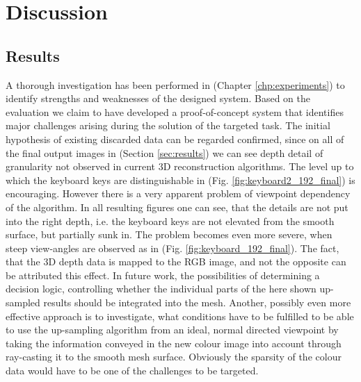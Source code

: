 \documentclass{ucl_thesis}
\newcommand{\figref}[1]{(Fig. \ref{#1})}
\newcommand{\secref}[1]{(Section \ref{#1})}
\newcommand{\chpref}[1]{(Chapter \ref{#1})}
\begin{document}
\chapter{Discussion} 
\label{chp:discussion}

\section{Results}
\label{sec:discussion_results}

\par A thorough investigation has been performed in \chpref{chp:experiments} to identify strengths and weaknesses of the designed system. Based on the evaluation we claim to have developed a proof-of-concept system that identifies major challenges arising during the solution of the targeted task. The initial hypothesis of existing discarded data can be regarded confirmed, since on all of the final output images in \secref{sec:results} we can see depth detail of granularity not observed in current 3D reconstruction algorithms. The level up to which the keyboard keys are  distinguishable in \figref{fig:keyboard2_192_final} is encouraging. However there is a very apparent problem of viewpoint dependency of the algorithm. In all resulting figures one can see, that the details are not put into the right depth, i.e. the keyboard keys are not elevated from the smooth surface, but partially sunk in. The problem becomes even more severe, when steep view-angles are observed as in \figref{fig:keyboard_192_final}. The fact, that the 3D depth data is mapped to the RGB image, and not the opposite can be attributed this effect. In future work, the possibilities of determining a decision logic, controlling whether the individual parts of the here shown up-sampled results should be integrated into the mesh. Another, possibly even more effective approach is to investigate, what conditions have to be fulfilled to be able to use the up-sampling algorithm from an ideal, normal directed viewpoint by taking the information conveyed in the new colour image into account through ray-casting it to the smooth mesh surface. Obviously the sparsity of the colour data would have to be one of the challenges to be targeted.
\end{document}
